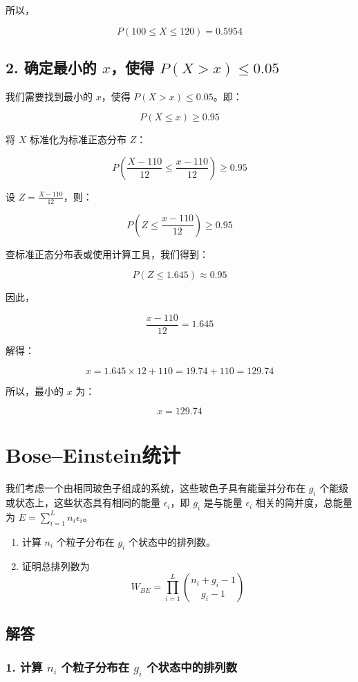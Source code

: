 \documentclass[UTF8]{report}
\theoremstyle{MyLineTheoremStyle} %
\theoremstyle{MyBlockTheoremStyle} %
\theoremstyle{MySubsubsectionStyle} %
\begin{document}
所以，

\[
P(100 \leq X \leq 120) = 0.5954
\]

\subsection*{2. 确定最小的 \(x\)，使得 \(P(X > x) \leq 0.05\)}

我们需要找到最小的 \(x\)，使得 \(P(X > x) \leq 0.05\)。即：

\[
P(X \leq x) \geq 0.95
\]

将 \(X\) 标准化为标准正态分布 \(Z\)：

\[
P\left(\frac{X - 110}{12} \leq \frac{x - 110}{12}\right) \geq 0.95
\]

设 \(Z = \frac{X - 110}{12}\)，则：

\[
P\left(Z \leq \frac{x - 110}{12}\right) \geq 0.95
\]

查标准正态分布表或使用计算工具，我们得到：

\[
P(Z \leq 1.645) \approx 0.95
\]

因此，

\[
\frac{x - 110}{12} = 1.645
\]

解得：

\[
x = 1.645 \times 12 + 110 = 19.74 + 110 = 129.74
\]

所以，最小的 \(x\) 为：

\[
x = 129.74
\]


\section{Bose–Einstein统计}

我们考虑一个由相同玻色子组成的系统，这些玻色子具有能量并分布在 \(g_i\) 个能级或状态上，这些状态具有相同的能量 \(\epsilon_i\)，即 \(g_i\) 是与能量 \(\epsilon_i\) 相关的简并度，总能量为 \(E = \sum_{i=1}^{L} n_i \epsilon_i\)。

\begin{enumerate}
    \item 计算 \(n_i\) 个粒子分布在 \(g_i\) 个状态中的排列数。
    \item 证明总排列数为
    \[
    W_{BE} = \prod_{i=1}^{L} \binom{n_i + g_i - 1}{g_i - 1}
    \]
\end{enumerate}

\subsection*{解答}

\subsubsection*{1. 计算 \(n_i\) 个粒子分布在 \(g_i\) 个状态中的排列数}
\end{document}
